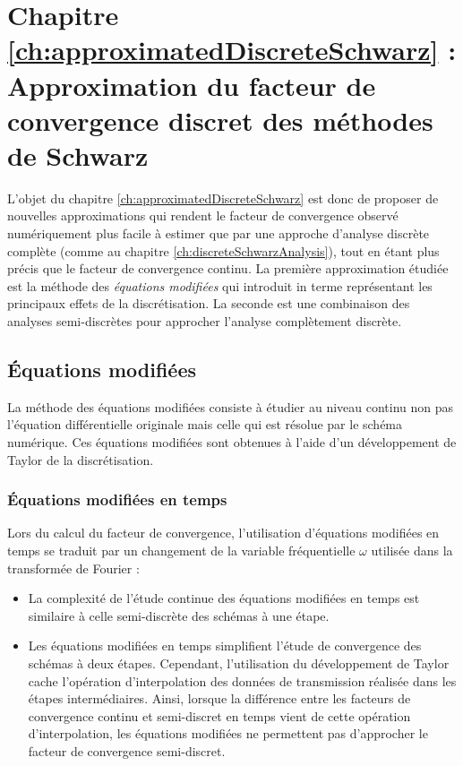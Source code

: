 \section*{Chapitre \ref{ch:approximatedDiscreteSchwarz} : Approximation du facteur de convergence discret des méthodes de Schwarz}
L'objet du chapitre \ref{ch:approximatedDiscreteSchwarz} est donc
de proposer de nouvelles approximations qui rendent le
facteur de convergence observé numériquement plus facile à estimer
que par une approche d'analyse discrète complète (comme au chapitre
\ref{ch:discreteSchwarzAnalysis}), tout en étant plus précis que le
facteur de convergence continu.
La première approximation étudiée est la méthode des
\textit{équations modifiées} qui introduit in terme représentant
les principaux effets de la discrétisation.
La seconde est une combinaison des analyses semi-discrètes
pour approcher l'analyse complètement discrète.
\subsection*{Équations modifiées}
La méthode des équations modifiées consiste à étudier au niveau
continu non pas l'équation différentielle originale mais celle
qui est résolue par le schéma numérique.
Ces équations modifiées sont obtenues à l'aide d'un développement
de Taylor de la discrétisation.
\subsubsection*{Équations modifiées en temps}
Lors du calcul du facteur de convergence, l'utilisation d'équations
modifiées en temps se traduit par un changement de la variable
fréquentielle $\omega$ utilisée dans la transformée de Fourier :
\begin{itemize}
	\item
La complexité de l'étude continue des équations modifiées en temps
est similaire à celle semi-discrète des schémas à une étape.
	\item
Les équations modifiées en temps simplifient l'étude de convergence
des schémas à deux étapes. Cependant, l'utilisation du développement
de Taylor cache l'opération d'interpolation des données de
transmission réalisée dans les étapes intermédiaires. Ainsi, lorsque la
différence entre les facteurs de convergence continu
et semi-discret en temps vient de cette opération d'interpolation,
les équations modifiées ne permettent pas d'approcher le facteur
de convergence semi-discret.
\end{itemize}
